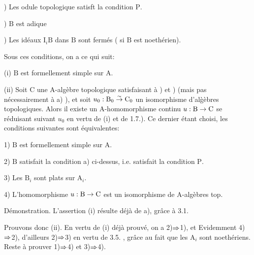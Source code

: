 ) Les odule topologique    satisft la condition $\mathrm P$.


) $\mathrm B$ est adique 

) Les idéaux $\mathrm I_i\mathrm B$ dans $\mathrm B$ sont fermés ( si $\mathrm B$ est noethérien).

Sous ces conditions, on a ce qui suit:

(i) $\mathrm B$ est formellement simple sur $\mathrm A$.

(ii) Soit $\mathrm C$ une $\mathrm A$-algèbre topologique satisfaisant à ) et ) (mais pas nécessairement à a) ), et soit $u_0:\mathrm B_0\overset{\sim}{\to}\mathrm C_0$ un isomorphisme d'al\`{g}èbres topologiques. Alors il existe un $\mathrm A$-homomorphisme continu $u:\mathrm B\to\mathrm C$ se réduisant suivant $u_0$ \handwritten{(}en vertu de (i) et de 1.7.). Ce dernier étant choisi, les conditions suivantes sont équivalentes: 

1) $\mathrm B$ est formellement simple sur $\mathrm A$.

2)  $\mathrm B$ satisfait la condition a) ci-dessus, i.e.  satisfait la condition $\mathrm P$.

3) Les $\mathrm B_i$ sont plats sur $\mathrm A_i$.

4) L'homomorphisme $u:\mathrm B\to\mathrm C$ est un isomorphisme\deleted{\unsure{,}} de $\mathrm A$-algèbres top.


Démonstration. L'assertion (i) résulte déjà de a), grâce à 3.1.

Prouvons donc (ii). En vertu de (i) déjà prouvé, on a 2)$\Rightarrow$1), et Evidemment 4)$\Rightarrow$2), d'ailleurs 2)$\Rightarrow$3) en vertu de 3.5. , grâce au fait que les $\mathrm A_i$ sont noethériens. Reste à prouver 1)$\Rightarrow$4) et 3)$\Rightarrow$4).

